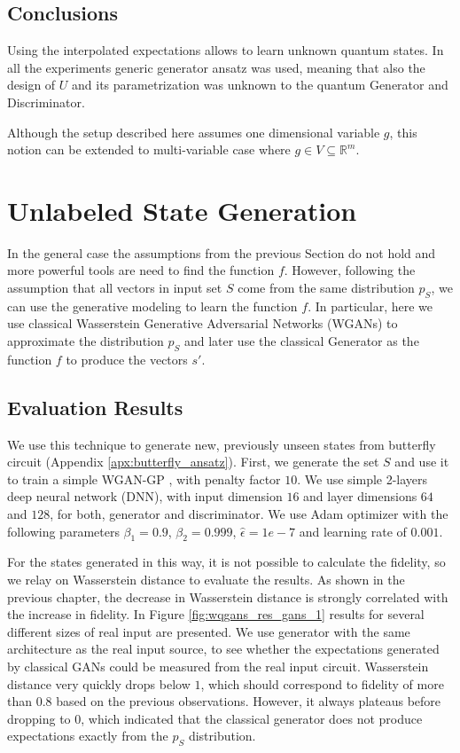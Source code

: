 \subsection{Conclusions}
Using the interpolated expectations allows to learn unknown quantum states.
In all the experiments generic generator ansatz was used, meaning that also the
design of $U$ and its parametrization was unknown to the quantum Generator and
Discriminator.

Although the setup described here assumes one dimensional variable $g$, this
notion can be extended to multi-variable case where $g \in V \subseteq
\mathbb{R}^m$.



\section{Unlabeled State Generation}
In the general case the assumptions from the previous Section do not hold and
more powerful tools are need to find the function $f$. However, following the assumption
that all vectors in input set $S$ come from the same distribution $p_S$, we can use
the generative modeling to learn the function $f$. In particular, here we use
classical Wasserstein Generative Adversarial Networks (WGANs) to approximate the
distribution $p_S$ and later use the classical Generator as the function $f$ to
produce the vectors $s'$. 

\subsection{Evaluation Results}
We use this technique to generate new, previously unseen states from butterfly circuit
(Appendix \ref{apx:butterfly_ansatz}). First, we generate the set $S$ and use it
to train a simple WGAN-GP \cite{gulrajani2017improved}, with penalty factor
$10$. We use simple 2-layers deep neural network (DNN), with input dimension $16$ and
layer dimensions $64$ and $128$, for both, generator and
discriminator. We use Adam optimizer \cite{kingma2017adam} with the following
parameters $\beta_1 = 0.9$, $\beta_2 = 0.999$, $\hat{\epsilon} = 1e - 7$ and
learning rate of $0.001$. 

For the states generated in this way, it is not possible to calculate the fidelity, so we
relay on Wasserstein distance to evaluate the results. As shown in the previous
chapter, the decrease in Wasserstein distance is strongly correlated with
the increase in fidelity. In Figure \ref{fig:wqgans_res_gans_1} results for
several different sizes of real input are presented. We use generator with the
same architecture as the real input source, to see whether the expectations
generated by classical GANs could be measured from the real input circuit.
Wasserstein distance very quickly drops below $1$, which should correspond to
fidelity of more than $0.8$ based on the previous observations. However, it
always plateaus before dropping to 0, which indicated that the classical
generator does not produce expectations exactly from the $p_S$ distribution.

